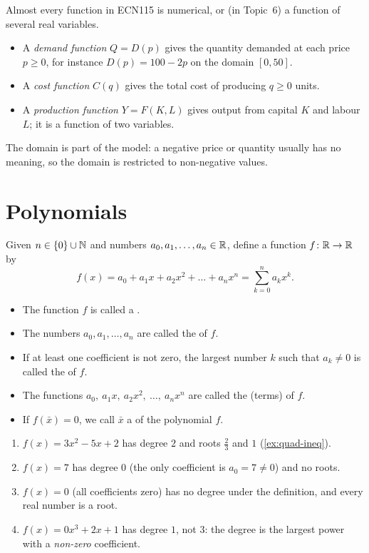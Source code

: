Almost every function in ECN115 is numerical, or (in Topic~6) a function of several real variables.

\begin{external}
\begin{itemize}
  \item A \emph{demand function} $Q=D(p)$ gives the quantity demanded at each price $p\ge0$, for instance $D(p)=100-2p$
  on the domain $[0,50]$.
  \item A \emph{cost function} $C(q)$ gives the total cost of producing $q\ge0$ units.
  \item A \emph{production function} $Y=F(K,L)$ gives output from capital $K$ and labour $L$; it is a function of two
  variables.
\end{itemize}
The domain is part of the model: a negative price or quantity usually has no meaning, so the domain is restricted to
non-negative values.
\end{external}

\section{Polynomials}\label{sec:polynomials}

\begin{definition}
Given $n\in\{0\}\cup\mathbb{N}$ and numbers $a_0,a_1,\dots,a_n\in\mathbb{R}$, define a function $f\colon\mathbb{R}\to\mathbb{R}$ by
\[
f(x)=a_0+a_1x+a_2x^2+\dots+a_nx^n=\sum_{k=0}^{n}a_kx^k.
\]
\begin{itemize}
  \item The function $f$ is called a .
  \item The numbers $a_0,a_1,\dots,a_n$ are called the  of $f$.
  \item If at least one coefficient is not zero, the largest number $k$ such that $a_k\ne0$ is called the
   of $f$.
  \item The functions $a_0,\ a_1x,\ a_2x^2,\ \dots,\ a_nx^n$ are called the  (terms) of $f$.
  \item If $f(\bar x)=0$, we call $\bar x$ a  of the polynomial $f$.
\end{itemize}
\end{definition}

\begin{example}
\begin{enumerate}
  \item $f(x)=3x^2-5x+2$ has degree $2$ and roots $\tfrac23$ and $1$ (\cref{ex:quad-ineq}).
  \item $f(x)=7$ has degree $0$ (the only coefficient is $a_0=7\ne0$) and no roots.
  \item $f(x)=0$ (all coefficients zero) has no degree under the definition, and every real number is a root.
  \item $f(x)=0x^3+2x+1$ has degree $1$, not $3$: the degree is the largest power with a \emph{non-zero} coefficient.
\end{enumerate}
\end{example}

